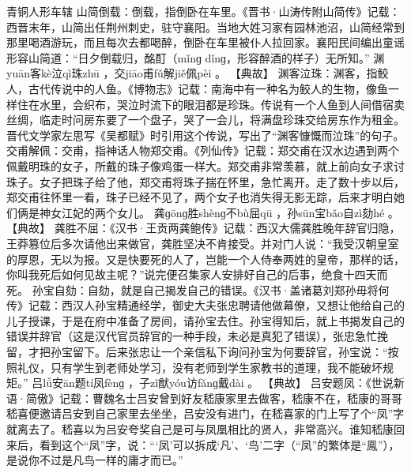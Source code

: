 \documentclass[12pt,UTF8]{ctexbook}
\begin{document}
青铜人形车辖
山简倒载：倒载，指倒卧在车里。《晋书·山涛传附山简传》记载：西晋末年，山简出任荆州刺史，驻守襄阳。当地大姓习家有园林池沼，山简经常到那里喝酒游玩，而且每次去都喝醉，倒卧在车里被仆人拉回家。襄阳民间编出童谣形容山简道：“日夕倒载归，酩酊（mǐnɡ dǐnɡ，形容醉酒的样子）无所知。”
渊yuān客kè泣qì珠zhū
，交jiāo甫fǔ解jiě佩pèi
。
【典故】
渊客泣珠：渊客，指鲛人，古代传说中的人鱼。《博物志》记载：南海中有一种名为鲛人的生物，像鱼一样住在水里，会织布，哭泣时流下的眼泪都是珍珠。传说有一个人鱼到人间借宿卖丝绸，临走时问房东要了一个盘子，哭了一会儿，将满盘珍珠交给房东作为租金。晋代文学家左思写《吴都赋》时引用这个传说，写出了“渊客慷慨而泣珠”的句子。
交甫解佩：交甫，指神话人物郑交甫。《列仙传》记载：郑交甫在汉水边遇到两个佩戴明珠的女子，所戴的珠子像鸡蛋一样大。郑交甫非常羡慕，就上前向女子求讨珠子。女子把珠子给了他，郑交甫将珠子揣在怀里，急忙离开。走了数十步以后，郑交甫往怀里一看，珠子已经不见了，两个女子也消失得无影无踪，后来才明白她们俩是神女江妃的两个女儿。
龚ɡōnɡ胜shènɡ不bù屈qū
，孙sūn宝bǎo自zì劾hé
。
【典故】
龚胜不屈：《汉书·王贡两龚鲍传》记载：西汉大儒龚胜晚年辞官归隐，王莽篡位后多次请他出来做官，龚胜坚决不肯接受。并对门人说：“我受汉朝皇室的厚恩，无以为报。又是快要死的人了，岂能一个人侍奉两姓的皇帝，那样的话，你叫我死后如何见故主呢？”说完便召集家人安排好自己的后事，绝食十四天而死。
孙宝自劾：自劾，就是自己揭发自己的错误。《汉书·盖诸葛刘郑孙毋将何传》记载：西汉人孙宝精通经学，御史大夫张忠聘请他做幕僚，又想让他给自己的儿子授课，于是在府中准备了房间，请孙宝去住。孙宝得知后，就上书揭发自己的错误并辞官（这是汉代官员辞官的一种手段，未必是真犯了错误），张忠急忙挽留，才把孙宝留下。后来张忠让一个亲信私下询问孙宝为何要辞官，孙宝说：“按照礼仪，只有学生到老师处学习，没有老师到学生家教书的道理，我不能破坏规矩。”
吕lǚ安ān题tí凤fènɡ
，子zǐ猷yóu访fǎnɡ戴dài
。
【典故】
吕安题凤：《世说新语·简傲》记载：曹魏名士吕安曾到好友嵇康家里去做客，嵇康不在，嵇康的哥哥嵇喜便邀请吕安到自己家里去坐坐，吕安没有进门，在嵇喜家的门上写了个“凤”字就离去了。嵇喜以为吕安夸奖自己是可与凤凰相比的贤人，非常高兴。谁知嵇康回来后，看到这个“凤”字，说：“‘凤’可以拆成‘凡’、‘鸟’二字（“凤”的繁体是“鳯”），是说你不过是凡鸟一样的庸才而已。”
\end{document}
